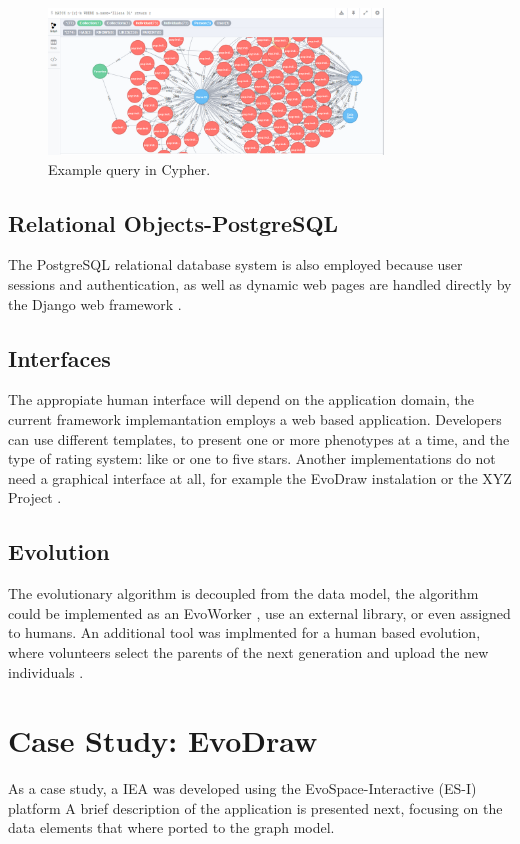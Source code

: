   \begin{figure}[!t]
    \centering
        \includegraphics[width=3.5in]{img/gui-neo.png}
    \caption{Example query in Cypher.}
    \label{fig:cypher}
  \end{figure}

\subsection{Relational Objects-PostgreSQL}
  The PostgreSQL relational database system is also employed because user 
  sessions and authentication,
  as well as dynamic web pages are handled directly by the Django web
  framework \cite{garcia2013evospace}. %

\subsection{Interfaces}
The appropiate human interface will depend on the application domain, 
the current framework implemantation employs a web based application. Developers 
can use different templates, to present one or more phenotypes 
at a time, and the type of rating system: like or one to five stars. 
Another implementations do not need a graphical interface at all, for example the
EvoDraw instalation or the XYZ Project \cite{de2014artists}.   
    
\subsection{Evolution}
The evolutionary algorithm is decoupled from the data model, the algorithm 
could be implemented as an EvoWorker \cite{garcia2013evospace}, use an external library, 
or even assigned to humans. An additional tool was implmented for a human based evolution, 
where volunteers select the parents of the next generation and upload the 
new individuals \cite{de2014artists}.  

\section{Case Study: EvoDraw}
As a case study, a IEA was developed using the 
EvoSpace-Interactive (ES-I) platform \cite{garcia2013evospace}
A brief description of the application is presented next, focusing
on the data elements that where ported to the graph model.

